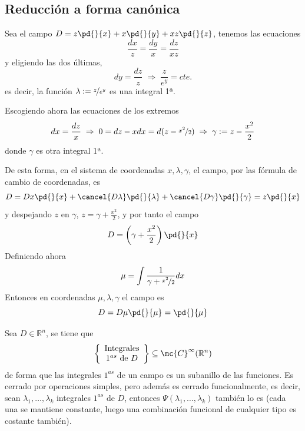    \subsection{Reducción a forma canónica}
    \begin{eje}
        Sea el campo $D=z \pd{}{x}+x\pd{}{y}+xz \pd{}{z}$, tenemos las ecuaciones
        $$\dfrac{dx}{z}=\dfrac{dy}{x}=\dfrac{dz}{xz}$$
        y eligiendo las dos últimas,
        $$dy=\dfrac{dz}{z} \; \Rightarrow \; \dfrac{z}{e^y}=cte.$$
        es decir, la función $\lambda:= \nicefrac{z}{e^y}$ es una integral 1ª.

        Escogiendo ahora las ecuaciones de los extremos
        $$dx=\dfrac{dz}{x} \; \Rightarrow \; 0=dz-xdx=d(z-\nicefrac{x^2}{2}) \; \Rightarrow \;  \gamma:= z-\dfrac{x^2}{2}$$
        donde $\gamma$ es otra integral 1ª.

        De esta forma, en el sistema de coordenadas $x,\lambda, \gamma$, el campo, por las fórmula de cambio de coordenadas, es
        $$D=Dx\pd{}{x}+\cancel{D\lambda}\pd{}{\lambda}+\cancel{D\gamma}\pd{}{\gamma}=z \pd{}{x}$$
        y despejando $z$ en $\gamma$, $z=\gamma+\frac{x^2}{2}$, y por tanto el campo 
        $$D=\left(\gamma + \dfrac{x^2}{2}\right) \pd{}{x}$$
        Definiendo ahora 
        $$\mu=\int \dfrac{1}{\gamma + \nicefrac{x^2}{2}} dx$$
        Entonces en coordenadas $\mu, \lambda, \gamma$ el campo es 
        $$D=D\mu \pd{}{\mu}=\pd{}{\mu}$$
    \end{eje}
    \begin{obs}
        Sea $D \in \mathbb R^n$, se tiene que 
        $$\left\{ \begin{array}{c}
            \text{Integrales}  \\
              1^{as} \text{ de } D
        \end{array}\right\} \subseteq \mc{C}^{\infty}(\mathbb R^n)$$
        de forma que las integrales $1^{as}$ de un campo es un subanillo de las funciones. Es cerrado por operaciones simples, pero además es cerrado funcionalmente, es decir, sean $\lambda_1, \ldots, \lambda_k$ integrales $1^{as}$ de $D$, entonces $\Psi(\lambda_1, \ldots, \lambda_k)$ también lo es (cada una se mantiene constante, luego una combinación funcional de cualquier tipo es costante también).
    \end{obs}

